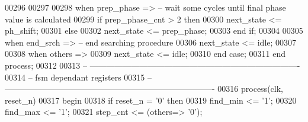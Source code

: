 \begin{DoxyCode}
00296          
00297          
00298       \textcolor{keywordflow}{when} \textcolor{vhdlchar}{prep\_phase} \textcolor{vhdlchar}{=}\textcolor{vhdlchar}{>}\textcolor{keyword}{     -- wait some cycles until final phase value is calculated}
00299          \textcolor{keywordflow}{if} \textcolor{vhdlchar}{prep_phase_cnt} \textcolor{vhdlchar}{>} \textcolor{vhdllogic}{}\textcolor{vhdllogic}{2} \textcolor{keywordflow}{then} 
00300             \textcolor{vhdlchar}{next_state} \textcolor{vhdlchar}{<=} \textcolor{vhdlchar}{ph\_shift};
00301          \textcolor{keywordflow}{else} 
00302             \textcolor{vhdlchar}{next_state} \textcolor{vhdlchar}{<=} \textcolor{vhdlchar}{prep\_phase};
00303          \textcolor{keywordflow}{end} \textcolor{keywordflow}{if};
00304          
00305       \textcolor{keywordflow}{when} \textcolor{vhdlchar}{end\_srch} \textcolor{vhdlchar}{=}\textcolor{vhdlchar}{>}\textcolor{keyword}{       -- end searching procedure}
00306          \textcolor{vhdlchar}{next_state} \textcolor{vhdlchar}{<=} \textcolor{vhdlchar}{idle};
00307          
00308       \textcolor{keywordflow}{when} \textcolor{keywordflow}{others} \textcolor{vhdlchar}{=}\textcolor{vhdlchar}{>} 
00309          \textcolor{vhdlchar}{next_state} \textcolor{vhdlchar}{<=} \textcolor{vhdlchar}{idle};
00310    \textcolor{keywordflow}{end} \textcolor{keywordflow}{case};
00311 \textcolor{keywordflow}{end} \textcolor{keywordflow}{process};
00312 
00313 \textcolor{keyword}{-- ----------------------------------------------------------------------------}
00314 \textcolor{keyword}{-- fsm dependant registers}
00315 \textcolor{keyword}{-- ----------------------------------------------------------------------------}
00316 \textcolor{keywordflow}{process}(clk, reset_n)
00317 \textcolor{vhdlkeyword}{begin}
00318    \textcolor{keywordflow}{if} \textcolor{vhdlchar}{reset_n} \textcolor{vhdlchar}{=} \textcolor{vhdlchar}{'}\textcolor{vhdllogic}{}\textcolor{vhdllogic}{0}\textcolor{vhdlchar}{'} \textcolor{keywordflow}{then} 
00319       \textcolor{vhdlchar}{find_min}       \textcolor{vhdlchar}{<=} \textcolor{vhdlchar}{'}\textcolor{vhdllogic}{}\textcolor{vhdllogic}{1}\textcolor{vhdlchar}{'};
00320       \textcolor{vhdlchar}{find_max}       \textcolor{vhdlchar}{<=} \textcolor{vhdlchar}{'}\textcolor{vhdllogic}{}\textcolor{vhdllogic}{1}\textcolor{vhdlchar}{'};
00321       \textcolor{vhdlchar}{step_cnt}       \textcolor{vhdlchar}{<=} \textcolor{vhdlchar}{(}\textcolor{keywordflow}{others}\textcolor{vhdlchar}{=}\textcolor{vhdlchar}{>} \textcolor{vhdlchar}{'}\textcolor{vhdllogic}{}\textcolor{vhdllogic}{0}\textcolor{vhdlchar}{'}\textcolor{vhdlchar}{)};

\end{DoxyCode}
